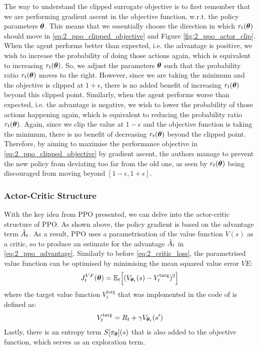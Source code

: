 The way to understand the clipped surrogate objective is to first remember that we are performing gradient ascent in the objective function, w.r.t. the policy parameters $\boldsymbol{\theta}$. This means that we essentially choose the direction in which $r_t(\boldsymbol{\theta})$ should move in \eqref{eq:2_ppo_clipped_objective} and Figure \ref{fig:2_ppo_actor_clip}. When the agent performs better than expected, i.e. the advantage is positive, we wish to increase the probability of doing those actions again, which is equivalent to increasing $r_t(\boldsymbol{\theta})$. So, we adjust the parameters $\boldsymbol{\theta}$ such that the probability ratio $r_t(\boldsymbol{\theta})$ moves to the right. However, since we are taking the minimum and the objective is clipped at $1+\epsilon$, there is no added benefit of increasing $r_t(\boldsymbol{\theta})$ beyond this clipped point. Similarly, when the agent performs worse than expected, i.e. the advantage is negative, we wish to lower the probability of those actions happening again, which is equivalent to reducing the probability ratio $r_t(\boldsymbol{\theta})$. Again, since we clip the value at $1-\epsilon$ and the objective function is taking the minimum, there is no benefit of decreasing $r_t(\boldsymbol{\theta})$ beyond the clipped point. Therefore, by aiming to maximise the performance objective in \eqref{eq:2_ppo_clipped_objective} by gradient ascent, the authors manage to prevent the new policy from deviating too far from the old one, as seen by $r_t(\boldsymbol{\theta})$ being discouraged from moving beyond $[1-\epsilon, 1+\epsilon]$. 


\subsubsection{Actor-Critic Structure}
With the key idea from PPO presented, we can delve into the actor-critic structure of PPO. As shown above, the policy gradient is based on the advantage term $\hat{A}_t$. As a result, PPO uses a parametrisation of the value function $V(s)$ as a critic, so to produce an estimate for the advantage $\hat{A}_t$ in \eqref{eq:2_ppo_advantage}.
Similarly to before \eqref{eq:2_critic_loss}, the parametrised value function can be optimised by minimising the mean squared value error $\overline{VE}$:
\begin{equation}
    J_t^{VF}(\boldsymbol{\theta}) = \mathbb{E}_t \Big[(V_{\boldsymbol{\theta}_t}(s) - V_t^{\text{targ}})^2\Big] \label{eq:2_ppo_critic_loss}
\end{equation}
where the target value function $V_t^{\text{targ}}$ that was implemented in the code of \cite{PPO} is defined as:
\begin{equation}
    V_t^{\text{targ}} = R_t + \gamma V_{\boldsymbol{\theta}_t}(s')
\end{equation}
Lastly, there is an entropy term $S[\pi_{\boldsymbol{\theta}}](s)$ that is also added to the objective function, which serves as an exploration term. 

